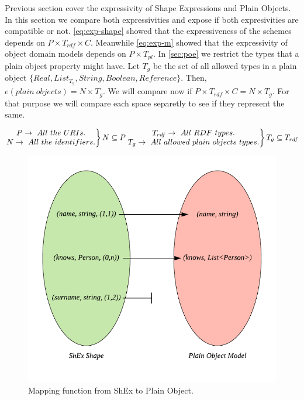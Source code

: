 Previous section cover the expressivity of Shape Expressions and Plain Objects.
In this section we compare both expressivities and expose if both expresivities
are compatible or not. \cref{eq:exp-shape} showed that the expressiveness of the
schemes depends on $P \times T_{rdf} \times C$. Meanwhile \cref{eq:exp-m} showed
that the expressivity of object domain models depends on $P \times T_{pl}$. In
\cref{sec:poe} we restrict the types that a plain object property might have.
Let $T_g$ be the set of all allowed types in a plain object $\{ Real, List_{T_g}, String, Boolean, Reference \}$.
Then, $e(plain\ objects) = N \times T_g$. We will compare now if $P \times T_{rdf} \times C = N \times T_g$.
For that purpose we will compare each space separetly to see if they represent the same.

\begin{equation}\label{eq:restrict-spaces}
    \left.\begin{matrix}
        P \rightarrow\ All\ the\ URIs.
     \\ N \rightarrow\ All\ the\ identifiers.
     \end{matrix}\right\} N \subseteq P\\
     \left.\begin{matrix}
        T_{rdf} \rightarrow\ All\ RDF\ types.
     \\ T_{g} \rightarrow\ All\ allowed\ plain\ objects\ types.
     \end{matrix}\right\} T_g \subseteq T_{rdf}\\
\end{equation}

\begin{figure}
    \includegraphics[scale=0.5]{images/shex-lite-mapping.pdf}
    \centering
    \caption[Mapping function from ShEx to Plain Object]{Mapping function from ShEx to Plain Object.}
    \label{fig:mapping-f}
\end{figure}

